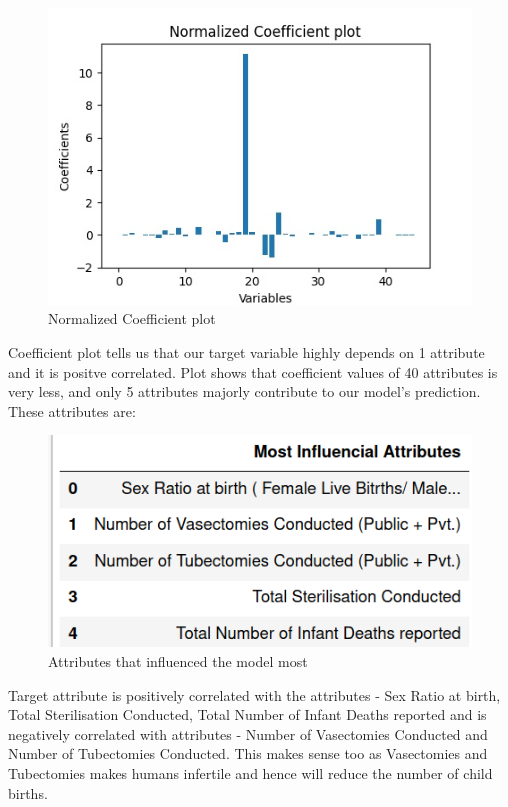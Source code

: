 \documentclass[12pt]{article}
\begin{document}
\begin{figure}[h]
\centering
\includegraphics[scale=1]{images/coefficient_plot.jpg}
\caption{Normalized Coefficient plot}
\end{figure}

\medskip
Coefficient plot tells us that our target variable highly depends on 1 attribute and it is positve correlated. Plot shows that coefficient values of 40 attributes is very less, and only 5 attributes majorly contribute to our model's prediction. These attributes are: 

\vspace{10pt}

\begin{figure}[h]
\centering
\includegraphics[scale=.5]{images/birthattributes.png}
\caption{Attributes that influenced the model most}
\end{figure}

Target attribute is positively correlated with the attributes - Sex Ratio at birth, Total Sterilisation Conducted, Total Number of Infant Deaths reported and is negatively correlated with attributes - Number of Vasectomies Conducted and Number of Tubectomies Conducted. This makes sense too as Vasectomies and Tubectomies makes humans infertile and hence will reduce the number of child births.	
\end{document}
